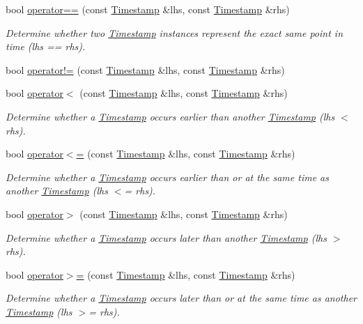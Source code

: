 \begin{DoxyCompactItemize}
\item 
bool \hyperlink{structTimestamp_a6ba02e876b394ec93278c0c0a637b00b}{operator==} (const \hyperlink{structTimestamp}{Timestamp} \&lhs, const \hyperlink{structTimestamp}{Timestamp} \&rhs)
\begin{DoxyCompactList}\small\item\em Determine whether two \hyperlink{structTimestamp}{Timestamp} instances represent the exact same point in time (lhs == rhs). \end{DoxyCompactList}\item 
bool \hyperlink{structTimestamp_a871e8e13bb69b649e30ecd751018742e}{operator!=} (const \hyperlink{structTimestamp}{Timestamp} \&lhs, const \hyperlink{structTimestamp}{Timestamp} \&rhs)
\item 
bool \hyperlink{structTimestamp_a5acdba63c4e30a6a4f60b5bd660d27f1}{operator$<$} (const \hyperlink{structTimestamp}{Timestamp} \&lhs, const \hyperlink{structTimestamp}{Timestamp} \&rhs)
\begin{DoxyCompactList}\small\item\em Determine whether a \hyperlink{structTimestamp}{Timestamp} occurs earlier than another \hyperlink{structTimestamp}{Timestamp} (lhs $<$ rhs). \end{DoxyCompactList}\item 
bool \hyperlink{structTimestamp_a788d441309be58a69f9e008eee26d54a}{operator$<$=} (const \hyperlink{structTimestamp}{Timestamp} \&lhs, const \hyperlink{structTimestamp}{Timestamp} \&rhs)
\begin{DoxyCompactList}\small\item\em Determine whether a \hyperlink{structTimestamp}{Timestamp} occurs earlier than or at the same time as another \hyperlink{structTimestamp}{Timestamp} (lhs $<$= rhs). \end{DoxyCompactList}\item 
bool \hyperlink{structTimestamp_aa16ec9b884f9fad57985d2c331139b69}{operator$>$} (const \hyperlink{structTimestamp}{Timestamp} \&lhs, const \hyperlink{structTimestamp}{Timestamp} \&rhs)
\begin{DoxyCompactList}\small\item\em Determine whether a \hyperlink{structTimestamp}{Timestamp} occurs later than another \hyperlink{structTimestamp}{Timestamp} (lhs $>$ rhs). \end{DoxyCompactList}\item 
bool \hyperlink{structTimestamp_af5e67a38f1e4968c30a4c57c34fd51e6}{operator$>$=} (const \hyperlink{structTimestamp}{Timestamp} \&lhs, const \hyperlink{structTimestamp}{Timestamp} \&rhs)
\begin{DoxyCompactList}\small\item\em Determine whether a \hyperlink{structTimestamp}{Timestamp} occurs later than or at the same time as another \hyperlink{structTimestamp}{Timestamp} (lhs $>$= rhs). \end{DoxyCompactList}\end{DoxyCompactItemize}


